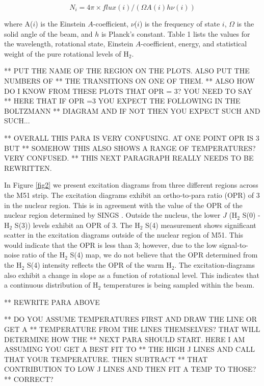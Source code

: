 \documentclass[manuscript]{aastex}
\begin{document}
\begin{equation}
N_i = 4 \pi \times flux(i)/(\Omega A(i)h\nu (i))
\end{equation}

where A($i$) is the Einstein $A$-coefficient, $\nu$($i$) is the
frequency of state $i$, $\Omega$ is the solid angle of the beam, and
$h$ is Planck's constant.  Table 1 lists the values for the
wavelength, rotational state, Einstein $A$-coefficient, energy, and
statistical weight of the pure rotational levels of $\mathrm{H_2}$.

** PUT THE NAME OF THE REGION ON THE PLOTS.  ALSO PUT THE NUMBERS OF
** THE TRANSITIONS ON ONE OF THEM.  
** ALSO HOW DO I KNOW FROM THESE PLOTS THAT OPR = 3?  YOU NEED TO SAY
** HERE THAT IF OPR =3 YOU EXPECT THE FOLLOWING IN THE BOLTZMANN
** DIAGRAM AND IF NOT THEN YOU EXPECT SUCH AND SUCH...

** OVERALL THIS PARA IS VERY CONFUSING.  AT ONE POINT OPR IS 3 BUT
** SOMEHOW THIS ALSO SHOWS A RANGE OF TEMPERATURES?  VERY CONFUSED.
** THIS NEXT PARAGRAPH REALLY NEEDS TO BE REWRITTEN.

In Figure \ref{fig2} we present excitation diagrams from three
different regions across the M51 strip.  The excitation diagrams
exhibit an ortho-to-para ratio (OPR) of 3 in the nuclear region.  This
is in agreement with the value of the OPR of the nuclear region
determined by SINGS \citep{rou07}.  Outside the nucleus, the lower $J$
($\mathrm{H_2}$ S(0) - $\mathrm{H_2}$ S(3)) levels exhibit an OPR of
3.  The $\mathrm{H_2}$ S(4) measurement shows significant scatter in
the excitation diagrams outside of the nuclear region of M51.  This
would indicate that the OPR is less than 3; however, due to the low
signal-to-noise ratio of the $\mathrm{H_2}$ S(4) map, we do not
believe that the OPR determined from the $\mathrm{H_2}$ S(4) intensity
reflects the OPR of the warm $\mathrm{H_2}$.  The excitation-diagrams
also exhibit a change in slope as a function of rotational level.
This indicates that a continuous distribution of $\mathrm{H_2}$
temperatures is being sampled within the beam.


** REWRITE PARA ABOVE 

** DO YOU ASSUME TEMPERATURES FIRST AND DRAW THE LINE OR GET A
** TEMPERATURE FROM THE LINES THEMSELVES?  THAT WILL DETERMINE HOW THE
** NEXT PARA SHOULD START.  HERE I AM ASSUMING YOU GET A BEST FIT TO
** THE HIGH J LINES AND CALL THAT YOUR TEMPERATURE.  THEN SUBTRACT
** THAT CONTRIBUTION TO LOW J LINES AND THEN FIT A TEMP TO THOSE?
** CORRECT?
\end{document}
